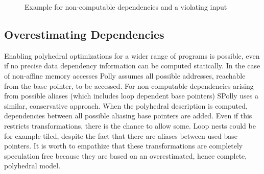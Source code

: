 \lstset{frame=none}
\begin{figure}[htbp]
  \centering
  

  \label{fig:NonComputableDependencies} 
  \caption{Example for non-computable dependencies and a violating input}
\end{figure}
\resetlst




\subsection{Overestimating Dependencies}
\label{OverestimatingDependencies}
Enabling polyhedral optimizations for a wider range of programs is possible, even
if no precise data dependency information can be computed statically. In the case
of non-affine memory accesses Polly assumes all possible addresses, 
reachable from the base pointer, to be accessed. For non-computable dependencies
arising from possible aliases (which includes loop dependent base pointers)
SPolly uses a similar, conservative approach. When the polyhedral description is
computed, dependencies between all possible aliasing base pointers are added. 
Even if this restricts transformations, there is the chance to allow some. 
Loop nests could be for example tiled, despite the fact that there are aliases 
between used base pointers. It is worth to empathize that 
these transformations are completely speculation free because they 
are based on an overestimated, hence complete, polyhedral model.




